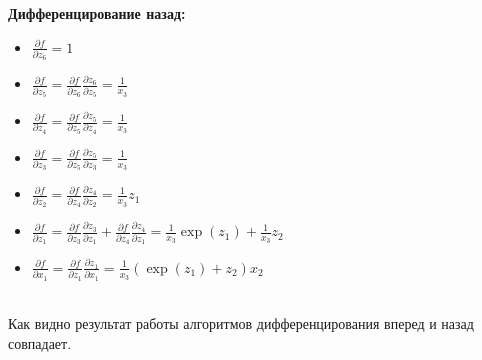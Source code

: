 {\bf Дифференцирование назад:}
\begin{itemize}
	\item $\frac{\partial f}{\partial z_6} = 1$
	\item $\frac{\partial f}{\partial z_5} = \frac{\partial f}{\partial z_6}\frac{\partial z_6}{\partial z_5} = \frac{1}{x_3}$
	\item $\frac{\partial f}{\partial z_4} = \frac{\partial f}{\partial z_5}\frac{\partial z_5}{\partial z_4} = \frac{1}{x_3}$
	\item $\frac{\partial f}{\partial z_3} = \frac{\partial f}{\partial z_5}\frac{\partial z_5}{\partial z_3} = \frac{1}{x_3}$
	\item $\frac{\partial f}{\partial z_2} = \frac{\partial f}{\partial z_4}\frac{\partial z_4}{\partial z_2} = \frac{1}{x_3}z_1$
	\item $\frac{\partial f}{\partial z_1} = \frac{\partial f}{\partial z_3}\frac{\partial z_3}{\partial z_1} + \frac{\partial f}{\partial z_4}\frac{\partial z_4}{\partial z_1} = \frac{1}{x_3}\exp(z_1) + \frac{1}{x_3}z_2$
	\item $\frac{\partial f}{\partial x_1} = \frac{\partial f}{\partial z_1}\frac{\partial z_1}{\partial x_1} = \frac{1}{x_3}\left(\exp(z_1) + z_2\right)x_2$
\end{itemize}
	~\\
Как видно результат работы алгоритмов дифференцирования вперед и назад совпадает.
